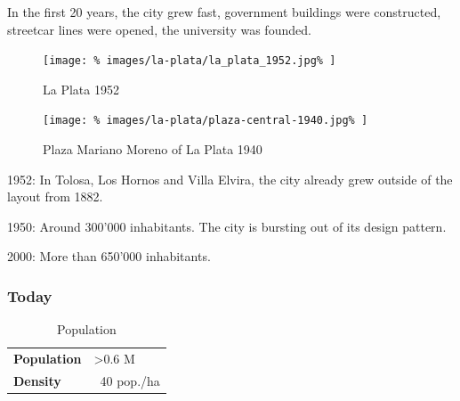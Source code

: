 \documentclass[twocolumn]{article}
\begin{document}
			
			
			In the first 20 years, the city grew fast, government buildings were constructed, streetcar lines were opened, the university was founded.
			
			
			
			
			
			
			\begin{figure}[H]
				\texttt{[image: \%
					images/la-plata/la\_plata\_1952.jpg\%
				]}
				\caption{La Plata 1952\cite{MOSP:InvestigacionHistorica}}
				\label{fig:map:la-plata-1952}
			\end{figure}
			
			\begin{figure}[H]
				\texttt{[image: \%
					images/la-plata/plaza-central-1940.jpg\%
				]}
				\caption{Plaza Mariano Moreno of La Plata 1940\cite{Blogspot:Arqruotolo:la-plata-o-la-geometria-hecha-espacio}}
				\label{fig:img:la-plata-1940}
			\end{figure}
			1952: In Tolosa, Los Hornos and Villa Elvira, the city already grew outside of the layout from 1882.
			
			1950: Around 300'000 inhabitants.
			The city is bursting out of its design pattern. 
			
			
			
			
			2000: More than 650'000 inhabitants.
			
			
		
			
			
			\subsubsection{Today}
			
			\begin{table}[H]			
				\centering
				\caption{Population}
				\label{table:la-plata-population}
				\begin{tabular}{|l|l|}
					\hline
					\textbf{Population} & \textgreater 0.6 M \\
					\textbf{Density}    & ~40 pop./ha \\
					\hline
				\end{tabular}
			\end{table}
			
\end{document}
